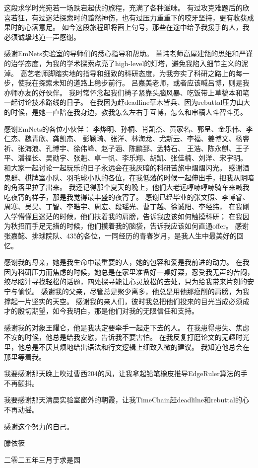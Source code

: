 \cleardoublepage
{}
这段求学时光宛若一场跌宕起伏的旅程，充满了各种滋味。
有过攻克难题后的欣喜若狂，有过迷茫探索时的黯然神伤，也有过压力重重下的咬牙坚持，更有收获成果时的心满意足。
如今这段旅程即将画上句号，那些在途中给予我援手的人，我必须诚挚地道一声感谢。

感谢EmNets实验室的导师们的悉心指导和帮助。
董玮老师高屋建瓴的思维和严谨的治学态度，为我的学术探索点亮了high-level的灯塔，避免我陷入细节主义的泥淖。
高艺老师脚踏实地的指导和细致的科研态度，为我夯实了科研之路上的每一步，使我在探索未知的道路上稳步前行。
吕嘉美老师，或者应该喊吕博，则是我亦师亦友的好伙伴。
我时常怀念起我们椅子紧靠头脑风暴、吃饭带上草稿本和笔一起讨论技术路线的日子。
在我因为赶deadline草木皆兵、因为rebuttal压力山大的时候，是她一直陪在我身边，教我怎么左右手互博，怎么和审稿人斗智斗勇。

感谢EmNets的各位小伙伴：
李烨明、孙桐、肖凯杰、黄家名、郭呈、金乐伟、李仁杰、魏青欣、龚凯杰、
彭颖琦、张洋、林海龙、尤新云、李福、姜博文、杨睿祈、张海浪、孔博宇、徐伟峰、赵子涵、陈鹏郅、孟特石、
王浩、陈永麒、王子平、潘福长、吴勋宇、张魁、卓一帆、李乐翔、胡凯、张佳楠、刘洋、宋宇明。
和大家一起讨论一起玩乐的日子永远会在我灰暗的科研苦旅中熠熠闪光。
感谢酒鬼群、棋牌室小队、羽毛球小队的各位，在我低落的时候一起伸出手，把我从阴暗的角落里拉了出来。
我还记得那个夏天的晚上，他们大老远哼哧哼哧骑车来喊我吃夜宵的样子，那是我觉得最丰盛的夜宵了。
感谢已经毕业的张文照、李博睿、周寒、吴昊、丁智、李皓宇、周宏、段瑶光、曹丁越、徐诚阳、李经纬，
在我刚入学懵懂且迷茫的时候，他们扶着我的肩膀，告诉我应该如何触摸科研；
在我因为秋招而手足无措的时候，他们摸着我的脑袋，告诉我应该如何直通offer。
感谢张嘉懿、排球院队、435的各位，一同经历的青春岁月，是我人生中最美好的回忆。

感谢我的母亲，她是我生命中最重要的人，她的包容和爱是我前进的动力。
在我因为科研压力而焦虑的时候，她总是在家里准备好一桌好菜，忍受我无声的苦闷，
绞尽脑汁寻找轻松的话题，四处探寻能让心灵放松的去处，只为给我带来片刻的安宁与愉悦。
感谢我的父亲，尽管总是聚少离多，他总是用他那瘦削的肩膀，为我撑起一片坚实的天空。
感谢我的亲人们，彼时我总把他们投来的目光当成必须成才的殷切期望，如今我明白，那是他们对我的无限信任和支持。

感谢我的对象王耀仑，他是我决定要牵手一起走下去的人。
在我患得患失、焦虑不安的时候，他总是给我安慰，告诉我不要害怕。
在我反复打磨论文的无趣时光里，他总是不厌其烦地给出语法和行文逻辑上细致入微的建议。
我知道他总会在那里等着我。

我要感谢那天晚上吹过曹西204的风，让我拿起铅笔橡皮推导EdgeRuler算法的手不再颤抖。

我要感谢那天清晨实验室窗外的朝霞，让我TimeChain赶deadlilne和rebuttal的心不再动摇。

感谢这个努力的自己。

\vspace{\baselineskip}

\noindent\hfill 滕依筱

\noindent\hfill 二零二五年三月于求是园 \\
